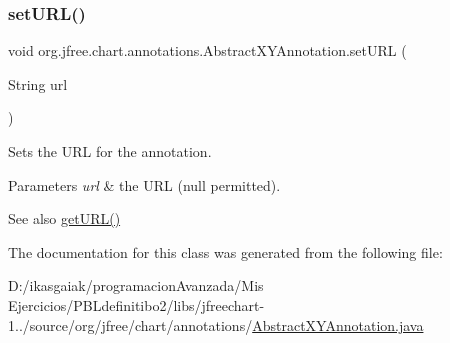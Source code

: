\subsubsection{\texorpdfstring{set\+U\+R\+L()}{setURL()}}
{\footnotesize\ttfamily void org.\+jfree.\+chart.\+annotations.\+Abstract\+X\+Y\+Annotation.\+set\+U\+RL (\begin{DoxyParamCaption}\item[{String}]{url }\end{DoxyParamCaption})}

Sets the U\+RL for the annotation.


\begin{DoxyParams}{Parameters}
{\em url} & the U\+RL ({\ttfamily null} permitted).\\
\hline
\end{DoxyParams}
\begin{DoxySeeAlso}{See also}
\mbox{\hyperlink{classorg_1_1jfree_1_1chart_1_1annotations_1_1_abstract_x_y_annotation_af3c7b1a1f7270c9a6d057adbb9e1e6f1}{get\+U\+R\+L()}} 
\end{DoxySeeAlso}


The documentation for this class was generated from the following file\+:\begin{DoxyCompactItemize}
\item 
D\+:/ikasgaiak/programacion\+Avanzada/\+Mis Ejercicios/\+P\+B\+Ldefinitibo2/libs/jfreechart-\/1../source/org/jfree/chart/annotations/\mbox{\hyperlink{_abstract_x_y_annotation_8java}{Abstract\+X\+Y\+Annotation.\+java}}\end{DoxyCompactItemize}
